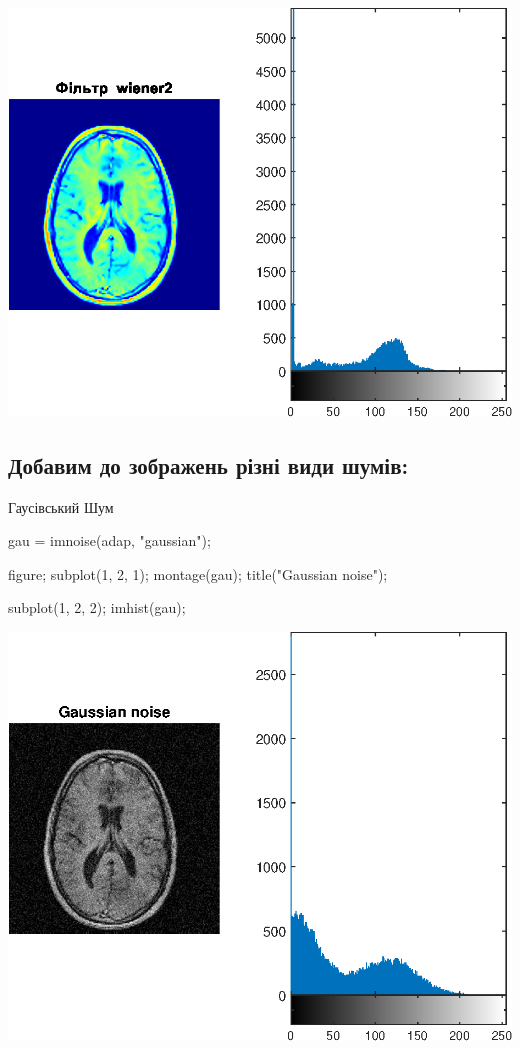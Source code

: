 \documentclass[12pt]{article}
\begin{document}
\begin{center}
\includegraphics[width=\maxwidth{56.196688409433015em}]{figure_2}
\end{center}

\newpage
\subsection*{Добавим до зображень різні види шумів:}


\begin{par}
\begin{flushleft}
Гаусівський Шум
\end{flushleft}
\end{par}

\begin{matlabcode}
gau = imnoise(adap, "gaussian");

figure;
subplot(1, 2, 1);
montage(gau);
title("Gaussian noise");

subplot(1, 2, 2);
imhist(gau);
\end{matlabcode}
\begin{center}
\includegraphics[width=\maxwidth{56.196688409433015em}]{figure_3}
\end{center}
\end{document}
